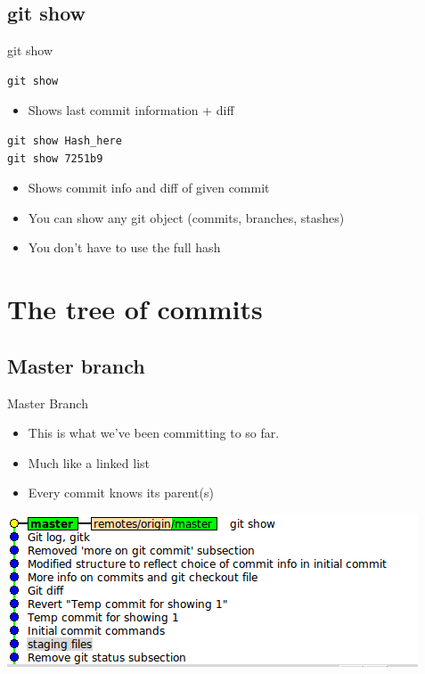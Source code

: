\documentclass[10pt,a4paper]{beamer}
\begin{document}
\subsection{git show}
\begin{frame}[fragile]{git show}
\begin{verbatim}
git show
\end{verbatim}
\begin{itemize}
\item Shows last commit information + diff
\end{itemize}

\begin{verbatim}
git show Hash_here
git show 7251b9
\end{verbatim}
\begin{itemize}
\item Shows commit info and diff of given commit
\item You can show any git object (commits, branches, stashes)
\item You don't have to use the full hash
\end{itemize}
\end{frame}


\section{The tree of commits}

\subsection{Master branch}
\begin{frame}{Master Branch}
\begin{itemize}
\item This is what we've been committing to so far.
\item Much like a linked list
\item Every commit knows its parent(s)
\end{itemize}
\includegraphics[width=\linewidth]{masterbranch.png}
\end{frame}
\end{document}
